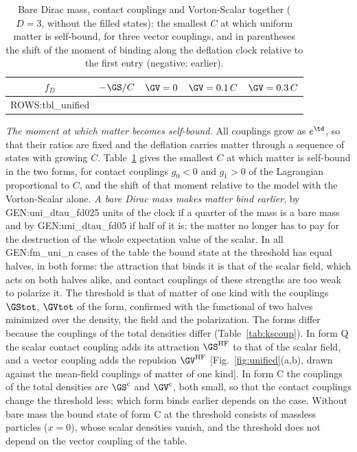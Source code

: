 \begin{table}
\caption{\label{tab:unified}Bare Dirac mass, contact couplings and Vorton-Scalar together ($D=3$,
without the filled states): the smallest $C$ at which uniform matter is self-bound, for three
vector couplings, and in parentheses the shift of the moment of binding along the deflation clock
relative to the first entry (negative: earlier).}
\begin{ruledtabular}
\begin{tabular}{ccccc}
$f_D$ & $-\GS/C$ & $\GV=0$ & $\GV=0.1\,C$ & $\GV=0.3\,C$ \\
\hline
{{ROWS:tbl_unified}}
\end{tabular}
\end{ruledtabular}
\end{table}
\emph{The moment at which matter becomes self-bound.} All couplings grow as $e^{\td}$, so that their
ratios are fixed and the deflation carries matter through a sequence of states with growing $C$.
Table~\ref{tab:unified} gives the smallest $C$ at which matter is self-bound in the two forms, for
contact couplings $g_0<0$ and $g_1>0$ of the Lagrangian proportional to $C$, and the shift of that
moment relative to the model with the Vorton-Scalar alone. \emph{A bare Dirac mass makes matter bind
earlier}, by {{GEN:uni_dtau_fd025}} units of the clock if a quarter of the mass is a bare mass and by
{{GEN:uni_dtau_fd05}} if half of it is: the matter no longer has to pay for the destruction of the
whole expectation value of the scalar. In all {{GEN:fm_uni_n}} cases of the table the bound state at
the threshold has equal halves, in both forms: the attraction that binds it is that of the scalar
field, which acts on both halves alike, and contact couplings of these strengths are too weak to
polarize it. The threshold is that of matter of one kind with the couplings $\GStot$, $\GVtot$ of the
form, confirmed with the functional of two halves minimized over the density, the field and the
polarization. The forms differ because the couplings of the total densities differ
(Table~\ref{tab:kscoup}). In form Q the scalar contact coupling adds its attraction
$\GS^{\mathrm{HF}}$ to that of the scalar field, and a vector coupling adds the repulsion
$\GV^{\mathrm{HF}}$ [Fig.~\ref{fig:unified}(a,b), drawn against the mean-field couplings of matter of
one kind]. In form C the couplings of the total densities are $\GS^{\mathrm c}$ and
$\GV^{\mathrm c}$, both small, so that the contact couplings change the threshold less; which form
binds earlier depends on the case. Without bare mass the bound state of form C at the threshold
consists of massless particles ($x=0$), whose scalar densities vanish, and the threshold does not
depend on the vector coupling of the table.

